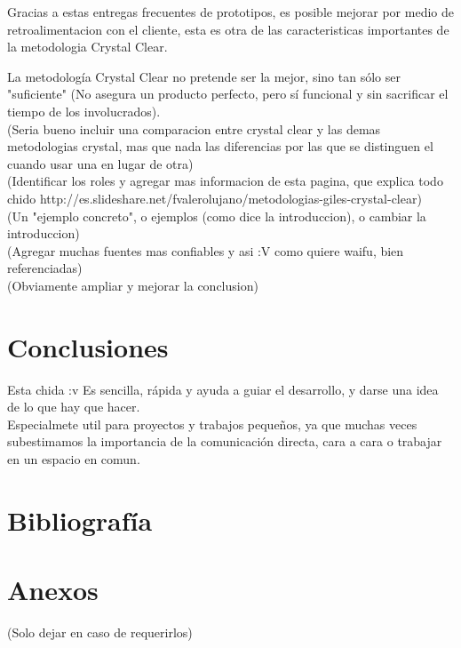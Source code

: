 \documentclass[12pt,a4paper]{article}
\begin{document}
	Gracias a estas entregas frecuentes de prototipos, es posible mejorar por medio de retroalimentacion con el cliente, esta es otra de las caracteristicas importantes de la metodologia Crystal Clear.
	
	La metodolog\'ia Crystal Clear no pretende ser la mejor, sino tan s\'olo ser "suficiente" (No asegura un producto perfecto, pero sí funcional y sin sacrificar el tiempo de los involucrados).\\
	
	(Seria bueno incluir una comparacion entre crystal clear y las demas metodologias crystal, mas que nada las diferencias por las que se distinguen el cuando usar una en lugar de otra)\\
	
	(Identificar los roles y agregar mas informacion de esta pagina, que explica todo chido
	http://es.slideshare.net/fvalerolujano/metodologias-giles-crystal-clear)\\
	
	(Un "ejemplo concreto", o ejemplos (como dice la introduccion), o cambiar la introduccion)\\
	
	(Agregar muchas fuentes mas confiables y asi :V como quiere waifu, bien referenciadas)\\
	
	(Obviamente ampliar y mejorar la conclusion)\\
	
	\section{Conclusiones}
	Esta chida :v Es sencilla, rápida y ayuda a guiar el desarrollo, y darse una idea de lo que hay que hacer.\\
	Especialmete util para proyectos y trabajos pequeños, ya que muchas veces subestimamos la importancia de la comunicación directa, cara a cara o trabajar en un espacio en comun.\\
	
	\section{Bibliografía}
	
	\section{Anexos}
	(Solo dejar en caso de requerirlos)
\end{document}
